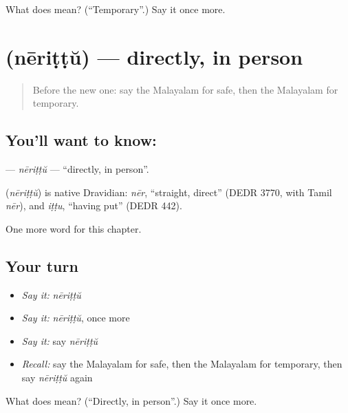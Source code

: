 \begin{tcolorbox}[breakable,colback=teal!4,colframe=teal!35!black,title={Before you move on}]
What does  mean? (\textquotedblleft{}Temporary\textquotedblright{}.) Say it once more.
\end{tcolorbox}
\section[\texorpdfstring{\ml{നേരിട്ട്} (nēriṭṭŭ)}{നേരിട്ട് (nēriṭṭŭ)}]{ (nēriṭṭŭ) — directly, in person}

\label{lesson:ML-C283-nerittu}



\begin{quote}
Before the new one: say the Malayalam for safe, then the Malayalam for temporary.
\end{quote}

\subsection*{You'll want to know: }
\textbf{} — \emph{nēriṭṭŭ} — \textquotedblleft{}directly, in person\textquotedblright{}.

\begin{cousinweb}
\textbf{} (\emph{nēriṭṭŭ}) is native Dravidian: \emph{nēr}, \textquotedblleft{}straight, direct\textquotedblright{} (DEDR 3770, with Tamil \emph{nēr}), and \emph{iṭṭu}, \textquotedblleft{}having put\textquotedblright{} (DEDR 442).
\end{cousinweb}

\begin{grammarlens}[title={What you've built}]
One more word for this chapter.
\end{grammarlens}

\subsection*{Your turn}
\begin{itemize}
\raggedright
  \item \emph{Say it:} \emph{nēriṭṭŭ}
  \item \emph{Say it:} \emph{nēriṭṭŭ}, once more
  \item \emph{Say it:} say \emph{nēriṭṭŭ}
  \item \emph{Recall:} say the Malayalam for safe, then the Malayalam for temporary, then say \emph{nēriṭṭŭ} again
\end{itemize}

\begin{tcolorbox}[breakable,colback=teal!4,colframe=teal!35!black,title={Before you move on}]
What does  mean? (\textquotedblleft{}Directly, in person\textquotedblright{}.) Say it once more.
\end{tcolorbox}
